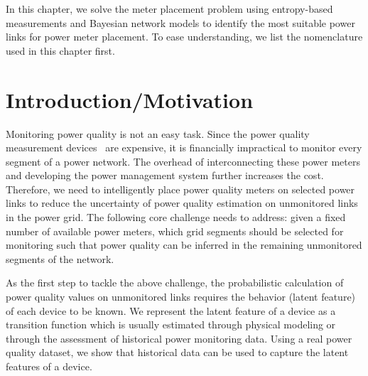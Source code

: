 \label{chap:meterPlacement}
In this chapter, we solve the meter placement problem using entropy-based measurements and Bayesian network models to identify the most suitable power links for power meter placement. To ease understanding, we list the nomenclature used in this chapter first. 

\small
\setlength{\nomitemsep}{-0.1em}
\printnomenclature

\normalsize
\section{Introduction/Motivation}
Monitoring power quality is not an easy task. Since the power quality measurement devices~\cite{schneider_meter} are expensive, it is financially impractical to monitor every segment of a power network. The overhead of interconnecting these power meters and developing the power management system further increases the cost. Therefore, we need to intelligently place power quality meters on selected power links to reduce the uncertainty of power quality estimation on unmonitored links in the power grid. The following core challenge needs to address: given a fixed number of available power meters, which grid segments should be selected for monitoring such that power quality can be inferred in the remaining unmonitored segments of the network.

As the first step to tackle the above challenge, the probabilistic calculation of power quality values on unmonitored links requires the behavior (latent feature) of each device to be known. We represent the latent feature of a device as a transition function which is usually estimated through physical modeling or through the assessment of historical power monitoring data. Using a real power quality dataset, we show that historical data can be used to capture the latent features of a device.

